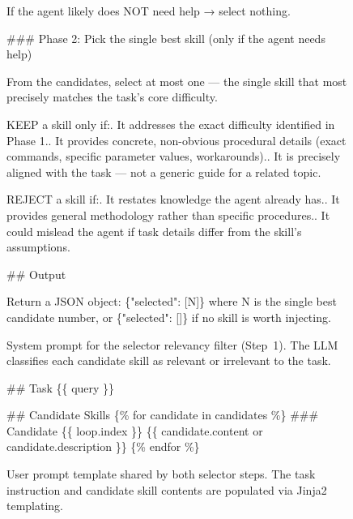 \documentclass[11pt]{article}
\begin{document}
\begin{figure}[!p]
\begin{tcolorbox}[title=Selector System Prompt (Relevancy), colback=gray!5, colframe=gray!50, fonttitle=\bfseries\small, fontupper=\scriptsize\ttfamily\raggedright]
If the agent likely does NOT need help → select nothing.\newline

\#\#\# Phase 2: Pick the single best skill (only if the agent needs help)\newline

From the candidates, select at most one --- the single skill that most precisely matches the task's core difficulty.\newline

KEEP a skill only if:. It addresses the exact difficulty identified in Phase 1.. It provides concrete, non-obvious procedural details (exact commands, specific parameter values, workarounds).. It is precisely aligned with the task --- not a generic guide for a related topic.\newline

REJECT a skill if:. It restates knowledge the agent already has.. It provides general methodology rather than specific procedures.. It could mislead the agent if task details differ from the skill's assumptions.\newline

\#\# Output\newline

Return a JSON object: \{"selected": [N]\} where N is the single best candidate number, or \{"selected": []\} if no skill is worth injecting.
\end{tcolorbox}
\caption{System prompt for the selector relevancy filter (Step~1).
The LLM classifies each candidate skill as relevant or irrelevant to the task.}
\label{box:selector_system_prompt}
\end{figure}

\begin{figure}[!p]
\begin{tcolorbox}[title=Selector User Prompt (Shared), colback=gray!5, colframe=gray!50, fonttitle=\bfseries\small, fontupper=\scriptsize\ttfamily\raggedright]
\#\# Task\newline
\{\{ query \}\}\newline

\#\# Candidate Skills\newline
\{\% for candidate in candidates \%\}\newline
\#\#\# Candidate \{\{ loop.index \}\}\newline
\{\{ candidate.content or candidate.description \}\}\newline
\{\% endfor \%\}
\end{tcolorbox}
\caption{User prompt template shared by both selector steps.
The task instruction and candidate skill contents are populated via Jinja2 templating.}
\label{box:selector_user_prompt}
\end{figure}
\end{document}
